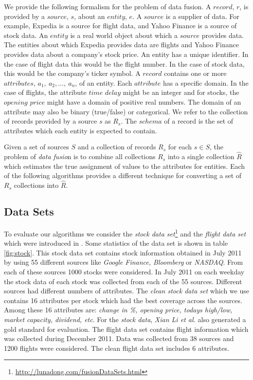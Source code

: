 \documentclass{acm_proc_article-sp}
\begin{document}
We provide the following formalism for the problem of data fusion. A $record$, $r$, is provided by a $source$, $s$, about an $entity$, $e$. A $source$ is a supplier of data. For example, Expedia is a source for flight data, and Yahoo Finance is a source of stock data.  An $entity$ is a real world object about which a $source$ provides data. The entities about which Expedia provides data are flights and Yahoo Finance provides data about a company's stock price. An entity has a unique identifier. In the case of flight data this would be the flight number. In the case of stock data, this would be the company's ticker symbol. A $record$ contains one or more $attributes$, $a_1,\ a_2,\dots,\ a_n$, of an entity. Each $attribute$ has a specific domain. In the case of flights, the attribute $time$ $delay$ might be an integer and for stocks, the $opening$ $price$ might have a domain of positive real numbers.  The domain of an attribute may also be binary (true/false) or categorical. We refer to the collection of records provided by a source $s$ as $R_s$. The $schema$ of a record is the set of attributes which each entity is expected to contain.

Given a set of sources $S$ and a collection of records $R_s$ for each $s \in S$, the problem of \emph{data fusio}n is to combine all collections $R_s$ into a single collection $\hat{R}$ which estimates the true assignment of values to the attributes for entities.  Each of the following algorithms provides a different technique for converting a set of $R_s$ collections into $\hat{R}$. 

\vspace {1cm}

\subsection{Data Sets}
To evaluate our algorithms we consider the \emph{stock data set}\footnote{\url{http://lunadong.com/fusionDataSets.html}} and the \emph{flight data set} which were introduced in \cite{li:truth}. Some statistics of the data set is shown in table \ref{fig:stock}. This stock data set contains stock information obtained in July 2011 by using 55 different sources like \emph{Google Finance, Bloomberg} or \emph{NASDAQ}. From each of these sources 1000 stocks were considered. In July 2011 on each weekday the stock data of each stock was collected from each of the 55 sources. Different sources had different numbers of attributes. The \emph{clean stock data set} which we use contains 16 attributes per stock which had the best coverage across the sources. Among these 16 attributes are: \emph{change in \%, opening price, todays high/low, market capacity, dividend, etc}. For the \emph{stock data}, \emph{Xian Li et al.} \cite{li:truth} also generated a gold standard for evaluation.
The flight data set contains flight information which was collected during December 2011. Data was collected from 38 sources and 1200 flights were considered. The clean flight data set includes 6 attributes.
\end{document}
